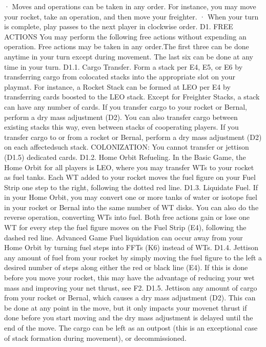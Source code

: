 \documentclass[a4paper]{book}
\begin{document}
·       Moves and operations can be taken in any order. For instance, you may move your rocket, take an operation, and then move your freighter. 
·       When your turn is complete, play passes to the next player in clockwise order.
D1. FREE ACTIONS
You may perform the following free actions without expending an operation. Free actions may be taken in any order.The first three can be done anytime in your turn except during movement. The last six can be done at any time in your turn.
D1.1. Cargo Transfer. Form a stack per E4, E5, or E6 by transferring cargo from colocated stacks into the appropriate slot on your playmat. For instance, a Rocket Stack can be formed at LEO per E4 by transferring cards boosted to the LEO stack. Except for Freighter Stacks, a stack can have any number of cards. If you transfer cargo to your rocket or Bernal, perform a dry mass adjustment (D2). You can also transfer cargo between existing stacks this way, even between stacks of cooperating players. If you transfer cargo to or from a rocket or Bernal, perform a dry mass adjustment (D2) on each affectedsuch stack.
COLONIZATION: You cannot transfer or jettison (D1.5) dedicated cards.
D1.2. Home Orbit Refueling. In the Basic Game, the Home Orbit for all players is LEO, where you may transfer WTs to your rocket as fuel tanks. Each WT added to your rocket moves the fuel figure on your Fuel Strip one step to the right, following the dotted red line.
D1.3. Liquidate Fuel. If in your Home Orbit, you may convert one or more tanks of water or isotope fuel in your rocket or Bernal into the same number of WT disks. You can also do the reverse operation, converting WTs into fuel. Both free actions gain or lose one WT for every step the fuel figure moves on the Fuel Strip (E4), following the dashed red line. {Advanced Game} Fuel liquidation can occur away from your Home Orbit by turning fuel steps into FFTs (K6) instead of WTs.
D1.4. Jettison any amount of fuel from your rocket by simply moving the fuel figure to the left a desired number of steps along either the red or black line (E4). If this is done before you move your rocket, this may have the advantage of reducing your wet mass and improving your net thrust, see F2.
D1.5. Jettison any amount of cargo from your rocket or Bernal, which causes a dry mass adjustment (D2). This can be done at any point in the move, but it only impacts your movenet thrust if done before you start moving and the dry mass adjustment is delayed until the end of the move. The cargo can be left as an outpost (this is an exceptional case of stack formation during movement), or decommissioned.
\end{document}

